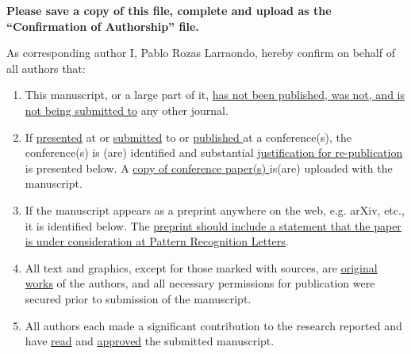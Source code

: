 \documentclass[times,twocolumn,final,authoryear]{elsarticle}
\begin{document}
\thispagestyle{empty}
                                                             
\begin{table}[!th]

\begin{minipage}{.9\textwidth}
\baselineskip12pt
\ifpreprint
  \vspace*{1pc}
\else
  \vspace*{-6pc}
\fi

\vskip6pt


\vskip1pc


{\bf Please save a copy of this file, complete and upload as the 
``Confirmation of Authorship'' file.}

\vskip1pc

As corresponding author 
I, Pablo Rozas Larraondo, 
hereby confirm on behalf of all authors that:

\vskip1pc

\begin{enumerate}
\itemsep=3pt
\item This manuscript, or a large part of it, \underline {has not been
published,  was not, and is not being submitted to} any other journal. 

\item If \underline {presented} at or \underline {submitted} to or
\underline  {published }at a conference(s), the conference(s) is (are)
identified and  substantial \underline {justification for
re-publication} is presented  below. A \underline {copy of
conference paper(s) }is(are) uploaded with the  manuscript.

\item If the manuscript appears as a preprint anywhere on the web, e.g.
arXiv,  etc., it is identified below. The \underline {preprint should
include a  statement that the paper is under consideration at Pattern
Recognition  Letters}.

\item All text and graphics, except for those marked with sources, are
\underline  {original works} of the authors, and all necessary
permissions for  publication were secured prior to submission of the
manuscript.

\item All authors each made a significant contribution to the research
reported  and have \underline {read} and \underline {approved} the
submitted  manuscript. 
\end{enumerate}


\end{minipage}
\end{table}
\end{document}
